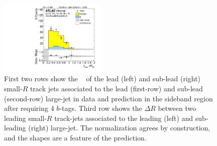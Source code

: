 \begin{figure}[htbp!]
\begin{center}
\includegraphics[width=0.45\textwidth,angle=-90]{figures/boosted/Sideband/b77_FourTag_Sideband_sublHCand_trk_dr.pdf}
  \caption{First two rows show the \pt~ of the lead (left) and sub-lead (right) small-$R$ track jets associated to the lead (first-row) and sub-lead (second-row) large-\R jet in data and prediction in the sideband region after requiring 4 $b$-tags. Third row shows the $\Delta R$ between two leading small-$R$ track-jets associated to the leading (left) and sub-leading (right) large-\R jet. The normalization agrees by construction, and the shapes are a feature of the prediction. }
  \label{fig:boosted-4b-sideband-ak2}
\end{center}
\end{figure}


